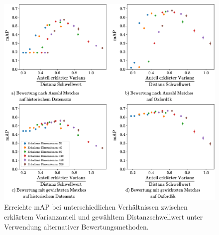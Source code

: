 \begin{figure}[h]
\includegraphics[scale=0.73]{mAP_var_dist_ratio_scoring_methods}
\caption{Erreichte mAP bei unterschiedlichen Verhältnissen zwischen erklärtem Varianzanteil und gewähltem Distanzschwellwert unter Verwendung alternativer Bewertungsmethoden.}
\label{mAP_var_dist_ratio_alternative_scoring}
\end{figure}